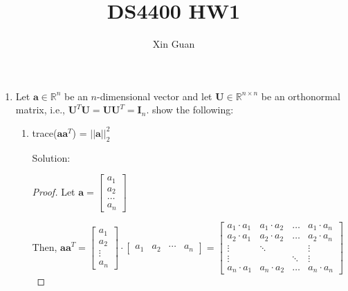 \documentclass[12pt]{article}
\title{DS4400 HW1}
\date{}
\author{Xin Guan}
\newcommand{\solu}{{\color{blue} Solution:}}
\newcommand{\Rbb}{\mathbb{R}}
\newcommand{\Upmb}{\pmb{U}}
\newcommand{\Ipmb}{\mathbf{I}}
\begin{document}
\maketitle
\begin{enumerate}
    \item Let $\pmb{a} \in \Rbb^n$ be an $n$-dimensional vector and let $\Upmb \in \Rbb^{n \times n}$ be an orthonormal matrix, i.e., $\Upmb^{T} \Upmb = \Upmb \Upmb^{T} = \Ipmb_n$. show the following:
          \begin{enumerate}
              \item trace($\pmb{a}\pmb{a}^T$) = $||\pmb{a}||^2_2$

                    \solu
                    \begin{proof}
                        Let $\pmb{a} = \begin{bmatrix}
                            a_1 \\ 
                            a_2 \\
                            \dots \\ 
                            a_n
                        \end{bmatrix}$

                        Then,
                        $
                            \pmb{a}\pmb{a}^T=
                            \begin{bmatrix}
                                a_{1}  \\
                                a_{2}  \\
                                \vdots \\
                                a_{n}
                            \end{bmatrix} \cdot
                            \begin{bmatrix}
                                a_{1} & a_2 & \cdots & a_n
                            \end{bmatrix}
                            =
                            \begin{bmatrix}
                                a_1 \cdot a_1 & a_1 \cdot a_2 & \dots  & a_1 \cdot a_n \\
                                a_2 \cdot a_1 & a_2 \cdot a_2 & \dots  & a_2 \cdot a_n \\
                                \vdots        & \ddots        &        & \vdots        \\
                                \vdots        &               & \ddots & \vdots        \\
                                a_n \cdot a_1 & a_n \cdot a_2 & \dots  & a_n \cdot a_n
                            \end{bmatrix}
                        $


\end{proof}
\end{enumerate}
\end{enumerate}
\end{document}

